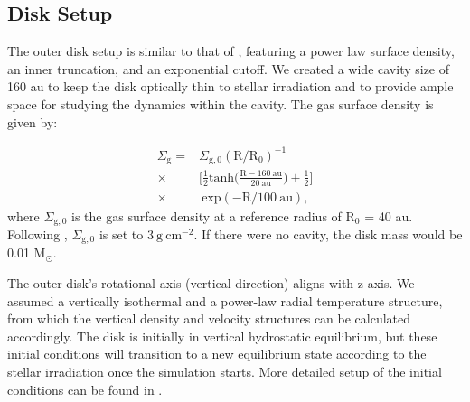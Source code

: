 \documentclass[twocolumn,tighten]{aastex631}
\begin{document}
\subsection{Disk Setup}
The outer disk setup is similar to that of \citet{zhang24}, featuring a power law surface density, an inner truncation, and an exponential cutoff. We created a wide cavity size of 160 au to keep the disk optically thin to stellar irradiation and to provide ample space for studying the dynamics within the cavity. The gas surface density is given by:

\begin{align}
    \Sigma_\mathrm{g} =& \Sigma_\mathrm{g,0} \mathrm{(R/R_0)^{-1}} \nonumber\\ \times & \Big[\frac{1}{2}
    \mathrm{tanh}\Big(\frac{\mathrm{R-160\ au}}{\mathrm{20\ au}}\Big) + \frac{1}{2}\Big] \nonumber\\ \times & \ \mathrm{exp(-R/100\ au)},
	\label{eq:surface density}
\end{align}
where $\Sigma_\mathrm{g,0}$ is the gas surface density at a reference radius of $\mathrm{R_0}$ = 40 au. Following \citet{zhu12}, $\Sigma_\mathrm{g,0}$ is set to $3\ \mathrm{g\ cm^{-2}}$. If there were no cavity, the disk mass would be 0.01 M$_\odot$.

The outer disk's rotational axis (vertical direction) aligns with z-axis.  We assumed a vertically isothermal and a power-law radial temperature structure, from which the vertical density and velocity structures can be calculated accordingly. The disk is initially in vertical hydrostatic equilibrium, but these initial conditions will transition to a new equilibrium state according to the stellar irradiation once the simulation starts. More detailed setup of the initial conditions can be found in \citet{zhang24}.
\end{document}
